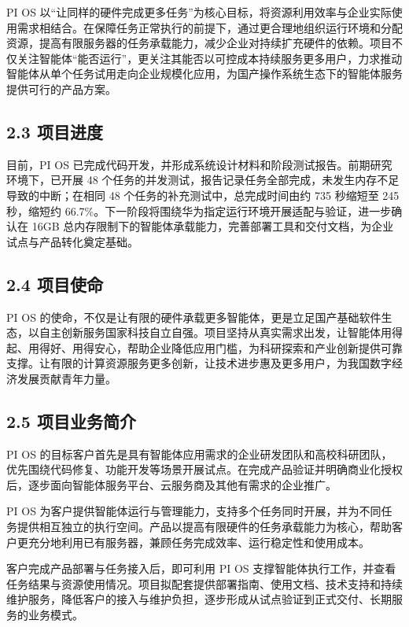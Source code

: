 PI OS 以``让同样的硬件完成更多任务''为核心目标，将资源利用效率与企业实际使用需求相结合。在保障任务正常执行的前提下，通过更合理地组织运行环境和分配资源，提高有限服务器的任务承载能力，减少企业对持续扩充硬件的依赖。项目不仅关注智能体``能否运行''，更关注其能否以可控成本持续服务更多用户，力求推动智能体从单个任务试用走向企业规模化应用，为国产操作系统生态下的智能体服务提供可行的产品方案。

\subsection{2.3 项目进度}\label{ux9879ux76eeux8fdbux5ea6}

目前，PI OS 已完成代码开发，并形成系统设计材料和阶段测试报告。前期研究环境下，已开展 48 个任务的并发测试，报告记录任务全部完成，未发生内存不足导致的中断；在相同 48 个任务的补充测试中，总完成时间由约 735 秒缩短至 245 秒，缩短约 66.7\%。下一阶段将围绕华为指定运行环境开展适配与验证，进一步确认在 16GB 总内存限制下的智能体承载能力，完善部署工具和交付文档，为企业试点与产品转化奠定基础。

\subsection{2.4 项目使命}\label{ux9879ux76eeux4f7fux547d}

PI OS 的使命，不仅是让有限的硬件承载更多智能体，更是立足国产基础软件生态，以自主创新服务国家科技自立自强。项目坚持从真实需求出发，让智能体用得起、用得好、用得安心，帮助企业降低应用门槛，为科研探索和产业创新提供可靠支撑。让有限的计算资源服务更多创新，让技术进步惠及更多用户，为我国数字经济发展贡献青年力量。

\subsection{2.5 项目业务简介}\label{ux9879ux76eeux4e1aux52a1ux7b80ux4ecb}

PI OS 的目标客户首先是具有智能体应用需求的企业研发团队和高校科研团队，优先围绕代码修复、功能开发等场景开展试点。在完成产品验证并明确商业化授权后，逐步面向智能体服务平台、云服务商及其他有需求的企业推广。

PI OS 为客户提供智能体运行与管理能力，支持多个任务同时开展，并为不同任务提供相互独立的执行空间。产品以提高有限硬件的任务承载能力为核心，帮助客户更充分地利用已有服务器，兼顾任务完成效率、运行稳定性和使用成本。

客户完成产品部署与任务接入后，即可利用 PI OS 支撑智能体执行工作，并查看任务结果与资源使用情况。项目拟配套提供部署指南、使用文档、技术支持和持续维护服务，降低客户的接入与维护负担，逐步形成从试点验证到正式交付、长期服务的业务模式。


